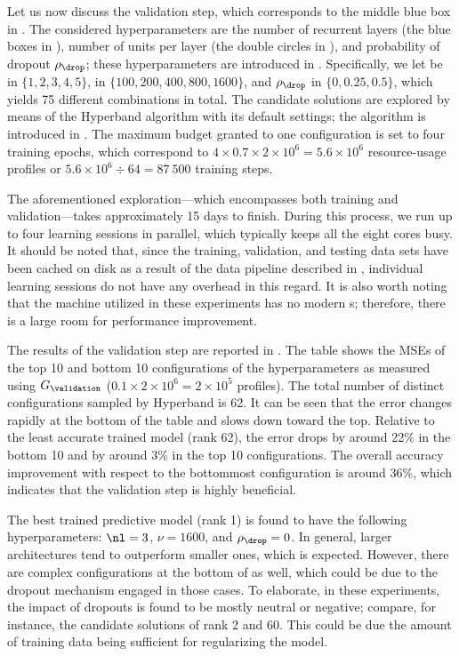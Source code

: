 Let us now discuss the validation step, which corresponds to the middle blue box
in . The considered hyperparameters are the number of
recurrent layers \nl (the blue boxes in ), number
of units per layer \nu (the double circles in ),
and probability of dropout $\rho_\drop$; these hyperparameters are introduced in
. Specifically, we let \nl be in $\{ 1, 2, 3, 4, 5
\}$, \nu in $\{ 100, 200, 400, 800, 1600 \}$, and $\rho_\drop$ in $\{ 0, 0.25,
0.5 \}$, which yields 75 different combinations in total. The candidate
solutions are explored by means of the Hyperband algorithm with its default
settings; the algorithm is introduced in . The
maximum budget granted to one configuration is set to four training epochs,
which correspond to $4 \times 0.7 \times 2 \times 10^6 = 5.6 \times 10^6$
resource-usage profiles or $5.6 \times 10^6 \div 64 = 87~500$ training steps.

The aforementioned exploration---which encompasses both training and
validation---takes approximately 15 days to finish. During this process, we run
up to four learning sessions in parallel, which typically keeps all the eight
cores busy. It should be noted that, since the training, validation, and testing
data sets have been cached on disk as a result of the data pipeline described in
, individual learning sessions do not have any
overhead in this regard. It is also worth noting that the machine utilized in
these experiments has no modern s; therefore, there is a large room for
performance improvement.

The results of the validation step are reported in . The
table shows the \acp{MSE} of the top 10 and bottom 10 configurations of the
hyperparameters as measured using $G_\validation$ ($0.1 \times 2 \times 10^6 = 2
\times 10^5$ profiles). The total number of distinct configurations sampled by
Hyperband is 62. It can be seen that the error changes rapidly at the bottom of
the table and slows down toward the top. Relative to the least accurate trained
model (rank 62), the error drops by around 22\% in the bottom 10 and by around
3\% in the top 10 configurations. The overall accuracy improvement with respect
to the bottommost configuration is around 36\%, which indicates that the
validation step is highly beneficial.

The best trained predictive model (rank 1) is found to have the following
hyperparameters: $\nl = 3$, $\nu = 1600$, and $\rho_\drop = 0$. In general,
larger architectures tend to outperform smaller ones, which is expected.
However, there are complex configurations at the bottom of
 as well, which could be due to the dropout mechanism
engaged in those cases. To elaborate, in these experiments, the impact of
dropouts is found to be mostly neutral or negative; compare, for instance, the
candidate solutions of rank 2 and 60. This could be due the amount of training
data being sufficient for regularizing the model.

